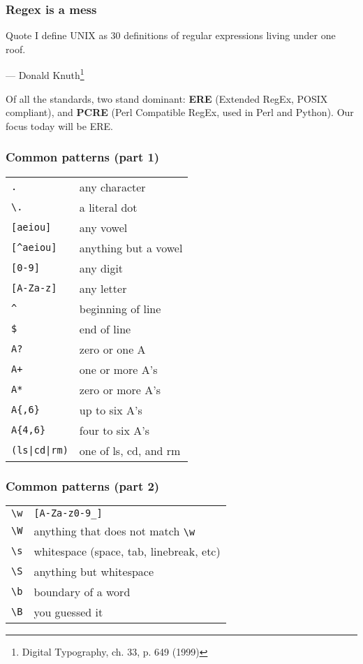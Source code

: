 \begin{frame}
\frametitle{Regex is a mess}
\begin{block}{Quote}
I define UNIX as 30 definitions of regular expressions living under one roof.
\begin{flushright}
    — Donald Knuth\footnote{Digital Typography, ch. 33, p. 649 (1999)}
\end{flushright}
\end{block}

Of all the standards, two stand dominant:
\textbf{ERE} (Extended RegEx, POSIX compliant), and
\textbf{PCRE} (Perl Compatible RegEx, used in Perl and Python).
Our focus today will be ERE.
\end{frame}

\begin{frame}[fragile]
\frametitle{Common patterns (part 1)}
\begin{table}
    \centering
    \begin{tabular}{ll}
        \verb|.|            & any character \\
        \verb|\.|           & a literal dot \\
        \verb|[aeiou]|      & any vowel \\
        \verb|[^aeiou]|     & anything but a vowel \\
        \verb|[0-9]|        & any digit \\
        \verb|[A-Za-z]|     & any letter \\
        \verb|^|            & beginning of line \\
        \verb|$|            & end of line \\
        \verb|A?|           & zero or one A \\
        \verb|A+|           & one or more A's \\
        \verb|A*|           & zero or more A's \\
        \verb|A{,6}|        & up to six A's \\
        \verb|A{4,6}|       & four to six A's \\
        \verb!(ls|cd|rm)!   & one of ls, cd, and rm
    \end{tabular}
\end{table}
\end{frame}

\begin{frame}[fragile]
\frametitle{Common patterns (part 2)}
\begin{table}
    \centering
    \begin{tabular}{ll}
        \verb|\w|           & \verb|[A-Za-z0-9_]| \\
        \verb|\W|           & anything that does not match \verb|\w| \\
        \verb|\s|           & whitespace (space, tab, linebreak, etc) \\
        \verb|\S|           & anything but whitespace \\
        \verb|\b|           & boundary of a word \\
        \verb|\B|           & you guessed it
    \end{tabular}
\end{table}
\end{frame}

